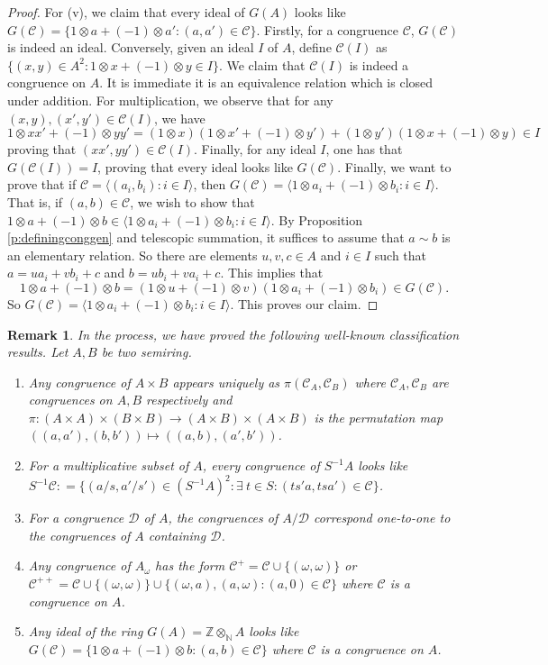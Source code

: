 \documentclass[notitlepage, 10pt]{article}
\theoremstyle{defin}
\theoremstyle{theo}
\theoremstyle{rema}
\newtheorem{rem}{Remark}[section]
\newcommand{\N}{\mathbb{N}}
\newcommand{\Z}{\mathbb{Z}}
\newcommand{\cC}{\mathcal{C}}
\newcommand{\cD}{\mathcal{D}}
\begin{document}
\begin{proof}
    For (v), we claim that every ideal of $G(A)$ looks like $G(\cC) = \{1\otimes a + (-1)\otimes a' : (a,a')\in \cC\}$. Firstly, for a congruence $\cC$, $G(\cC)$ is indeed an ideal. Conversely, given an ideal $I$ of $A$, define $\cC(I)$ as $\{(x,y) \in A^2 : 1\otimes x +(-1)\otimes y \in I\}$. We claim that $\cC(I)$ is indeed a congruence on $A$. It is immediate it is an equivalence relation which is closed under addition. For multiplication, we observe that for any $(x,y), (x',y')\in \cC(I)$, we have
    $$1\otimes xx' + (-1)\otimes yy' = (1\otimes x)(1\otimes x' + (-1)\otimes y') + (1\otimes y')(1\otimes x + (-1)\otimes y)\in I$$
    proving that $(xx', yy')\in \cC(I)$. Finally, for any ideal $I$, one has that $G(\cC(I))= I$, proving that every ideal looks like $G(\cC)$. Finally, we want to prove that if $\cC = \langle (a_i, b_i) : i\in I\rangle$, then $G(\cC) = \langle 1\otimes a_i + (-1)\otimes b_i : i\in I\rangle $. That is, if $(a,b)\in \cC$, we wish to show that $1\otimes a + (-1)\otimes b \in \langle 1\otimes a_i + (-1)\otimes b_i : i\in I\rangle$. By Proposition \ref{p:definingconggen} and telescopic summation, it suffices to assume that $a\sim b$ is an elementary relation. So there are elements $u, v,c\in A$ and $i\in I$ such that $a = ua_i+vb_i+c$ and $b=ub_i+va_i+c$. This implies that
    $$1\otimes a + (-1)\otimes b = (1\otimes u + (-1)\otimes v)(1\otimes a_i + (-1)\otimes b_i)\in G(\cC).$$
    So $G(\cC) = \langle 1\otimes a_i + (-1)\otimes b_i : i\in I\rangle$. This proves our claim. 
\end{proof}

\begin{rem}
    In the process, we have proved the following well-known classification results. Let $A, B$ be two semiring. 
    \begin{enumerate}
        \item Any congruence of $A\times B$ appears uniquely as $\pi(\cC_A, \cC_B)$ where $\cC_A, \cC_B$ are congruences on $A, B$ respectively and $\pi : (A\times A) \times (B \times B) \to (A\times B)\times (A\times B)$ is the permutation map $((a,a'), (b,b'))\mapsto ((a,b),(a',b'))$.
        \item For a multiplicative subset of $A$, every congruence of $S^{-1}A$ looks like $S^{-1}\cC : =\{ (a/s, a'/s')\in (S^{-1}A)^2   : \exists\> t\in S : (ts'a, tsa')\in \cC\}$.
        \item For a congruence $\cD$ of $A$, the congruences of $A/\cD$ correspond one-to-one to the congruences of $A$ containing $\cD$.
        \item Any congruence of $A_\omega$ has the form $\cC^{+} = \cC \cup \{(\omega, \omega)\} $ or $\cC^{++} =\cC \cup \{(\omega, \omega)\}\cup \{ (\omega , a), (a,\omega) : (a,0)\in \cC\}$ where $\cC$ is a congruence on $A$.
        \item Any ideal of the ring $G(A) = \Z\otimes_\N A$ looks like $G(\cC) = \{1\otimes a +(-1)\otimes b : (a,b) \in \cC\}$ where $\cC$ is a congruence on $A$.
    \end{enumerate}
\end{rem}
\end{document}
